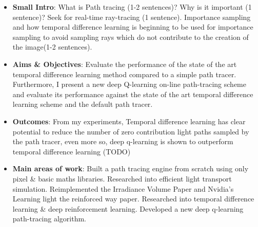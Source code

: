 \documentclass[ %
                    author={Callum Pearce},
                supervisor={Dr. Neill Campbell},
                    degree={MEng},
                     title={How effective are Temporal difference learning methods in reducing the number of zero contribution light paths in Path tracing?},
                  subtitle={},
                      type={research},
                      year={2019} ]{dissertation}
\begin{document}
\begin{itemize}
\item \textbf{Small Intro}: What is Path tracing (1-2 sentences)? Why is it important (1 sentence)? Seek for real-time ray-tracing (1 sentence). Importance sampling and how temporal difference learning is beginning to be used for importance sampling to avoid sampling rays which do not contribute to the creation of the image(1-2 sentences). 

\item \textbf{Aims \& Objectives}: Evaluate the performance of the state of the art temporal difference learning method compared to a simple path tracer. Furthermore, I present a new deep Q-learning on-line path-tracing scheme and evaluate its performance against the state of the art temporal difference learning scheme and the default path tracer.

\item \textbf{Outcomes}: From my experiments, Temporal difference learning has clear potential to reduce the number of zero contribution light paths sampled by the path tracer, even more so, deep q-learning is shown to outperform temporal difference learning (TODO)

\item \textbf{Main areas of work}: Built a path tracing engine from scratch using only pixel \& basic maths libraries. Researched into efficient light transport simulation. Reimplemented the Irradiance Volume Paper and Nvidia's Learning light the reinforced way paper. Researched into temporal difference learning \& deep reinforcement learning. Developed a new deep q-learning path-tracing algorithm.

\end{itemize}
\end{document}
